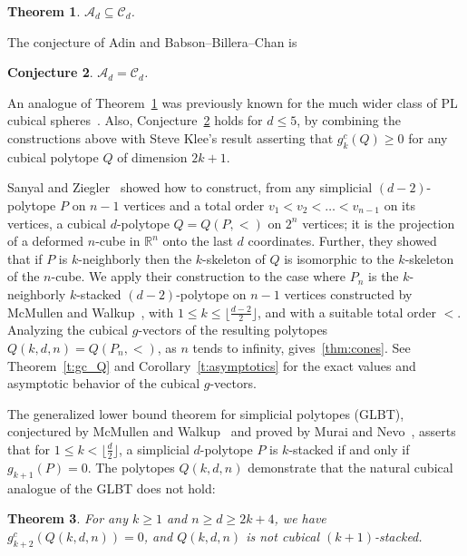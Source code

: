 \documentclass[a4paper,leqno]{article}
\newtheorem{theorem}{Theorem}%
\newtheorem{conjecture}[theorem]{Conjecture}
\theoremstyle{definition}
\newcommand{\drem}[1]{{\bf \color{blue} Danny says:} {\it\color{blue} #1}}
\newcommand{\gc}{g^c}
\begin{document}
\begin{theorem}\label{thm:cones}
$\mathcal{A}_d \subseteq \mathcal{C}_d$.
\end{theorem}

The conjecture of Adin and Babson--Billera--Chan is
\begin{conjecture}\label{conj:cones}
$\mathcal{A}_d = \mathcal{C}_d$.
\end{conjecture}

An analogue of Theorem~\ref{thm:cones} was previously known for the much wider class of PL cubical spheres~\cite[Theorem 5.7]{BabsBC97}.
Also, Conjecture~\ref{conj:cones} holds for $d\leq 5$, by combining the constructions above with Steve Klee's result \cite[Prop.3.7]{Klee11} asserting that $g^c_k(Q)\geq 0$ for any cubical polytope $Q$ of dimension $2k+1$.

Sanyal and Ziegler~\cite{SanyZ10} showed how to construct, from any simplicial $(d-2)$-polytope $P$ on $n-1$ vertices and a total order $v_1<v_2<\ldots <v_{n-1}$ on its vertices, a cubical $d$-polytope $Q=Q(P,<)$ on $2^n$ vertices; it is the projection of a deformed $n$-cube in $\mathbb{R}^n$ onto the last $d$ coordinates.
Further, they showed that if $P$ is $k$-neighborly then
the $k$-skeleton of $Q$ is isomorphic to the $k$-skeleton of the $n$-cube.
We apply their construction to the case where $P_n$ is the $k$-neighborly $k$-stacked $(d-2)$-polytope on $n-1$ vertices constructed by McMullen and Walkup~\cite{McMuW71}, with $1\leq k\leq \lfloor\frac{d-2}{2}\rfloor$, and with a suitable total order $<$. Analyzing the cubical $g$-vectors of the resulting polytopes $Q(k,d,n)=Q(P_n,<)$, as $n$ tends to infinity, gives~\autoref{thm:cones}. See Theorem~\ref{t:gc_Q} and Corollary~\ref{t:asymptotics} for the exact values and asymptotic behavior of the cubical $g$-vectors.

The generalized lower bound theorem for simplicial polytopes (GLBT), conjectured by McMullen and Walkup~\cite{McMuW71} and proved by Murai and Nevo~\cite{MuraN13}, asserts that for $1\le k<\lfloor\frac{d}{2}\rfloor$, a simplicial $d$-polytope $P$ is $k$-stacked if and only if $g_{k+1}(P)=0$.
The polytopes $Q(k,d,n)$ demonstrate that the natural cubical analogue of the GLBT does not hold:
\begin{theorem}\label{thm:IntroNoCGLBT}
	For any $k\ge 1$ and $n\ge d\ge 2k+4$, we have $\gc_{k+2}(Q(k,d,n))=0$, and $Q(k,d,n)$ is not cubical $(k+1)$-stacked.
\end{theorem}
\end{document}
